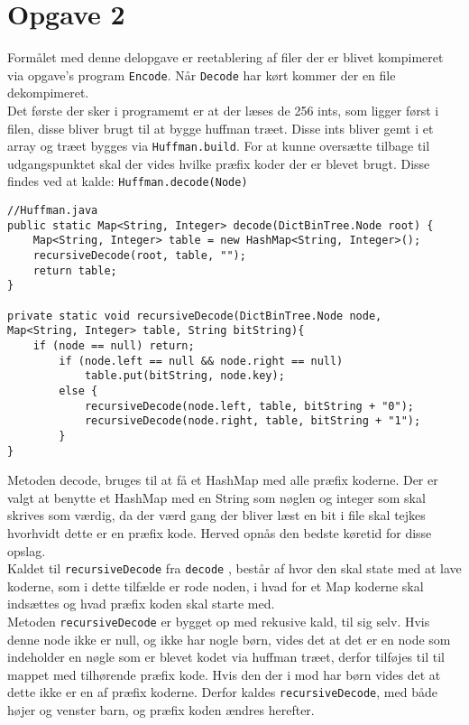 \documentclass{article}
\begin{document}
\section*{Opgave 2}
Formålet med denne delopgave er reetablering af filer der er blivet kompimeret via opgave's program \texttt{Encode}. Når \texttt{Decode} har kørt kommer der en file dekompimeret.\\
Det første der sker i programemt er at der læses de 256 ints, som ligger først i filen, disse bliver brugt til at bygge huffman træet. Disse ints bliver gemt i et array og træet bygges via \texttt{Huffman.build}. For at kunne oversætte tilbage til udgangspunktet skal der vides hvilke præfix koder der er blevet brugt. Disse findes ved at kalde: \texttt{Huffman.decode(Node)}
\begin{lstlisting}
//Huffman.java
public static Map<String, Integer> decode(DictBinTree.Node root) {
	Map<String, Integer> table = new HashMap<String, Integer>();
	recursiveDecode(root, table, "");
	return table;
}

private static void recursiveDecode(DictBinTree.Node node, 
Map<String, Integer> table, String bitString){
	if (node == null) return;
		if (node.left == null && node.right == null)
			table.put(bitString, node.key);
		else {
            recursiveDecode(node.left, table, bitString + "0");
            recursiveDecode(node.right, table, bitString + "1");
		}
}
\end{lstlisting}
Metoden decode, bruges til at få et HashMap med alle præfix koderne. Der er valgt at benytte et HashMap med en String som nøglen og integer som skal skrives som værdig, da der værd gang der bliver læst en bit i file skal tejkes hvorhvidt dette er en præfix kode. Herved opnås den bedste køretid for disse opslag.\\
Kaldet til \texttt{recursiveDecode} fra \texttt{decode} , består af hvor den skal state med at lave koderne, som i dette tilfælde er rode noden, i hvad for et Map koderne skal indsættes og hvad præfix koden skal starte med.\\
Metoden \texttt{recursiveDecode} er bygget op med rekusive kald, til sig selv. Hvis denne node ikke er null, og ikke har nogle børn, vides det at det er en node som indeholder en nøgle som er blevet kodet via huffman træet, derfor tilføjes til til mappet med tilhørende præfix kode. Hvis den der i mod har børn vides det at dette ikke er en af præfix koderne. Derfor kaldes \texttt{recursiveDecode}, med både højer og venster barn, og præfix koden ændres herefter.\\
\end{document}
